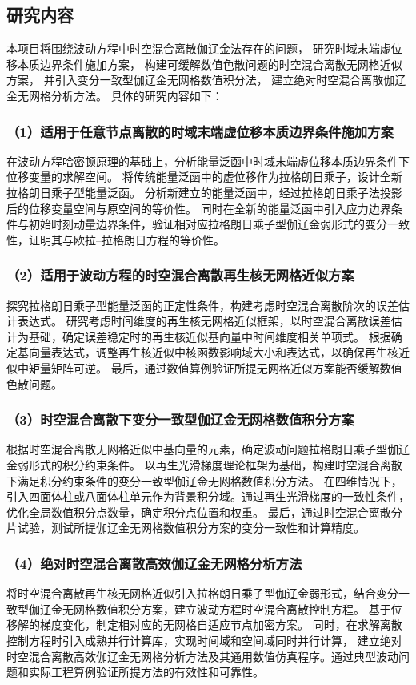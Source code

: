 \subsection{研究内容}
本项目将围绕波动方程中时空混合离散伽辽金法存在的问题，
研究时域末端虚位移本质边界条件施加方案，
构建可缓解数值色散问题的时空混合离散无网格近似方案，
并引入变分一致型伽辽金无网格数值积分法，
建立绝对时空混合离散伽辽金无网格分析方法。
具体的研究内容如下：

\subsubsection*{\bfseries （1）适用于任意节点离散的时域末端虚位移本质边界条件施加方案}
在波动方程哈密顿原理的基础上，分析能量泛函中时域末端虚位移本质边界条件下位移变量的求解空间。
将传统能量泛函中的虚位移作为拉格朗日乘子，设计全新拉格朗日乘子型能量泛函。
分析新建立的能量泛函中，经过拉格朗日乘子法投影后的位移变量空间与原空间的等价性。
同时在全新的能量泛函中引入应力边界条件与初始时刻动量边界条件，验证相对应拉格朗日乘子型伽辽金弱形式的变分一致性，证明其与欧拉--拉格朗日方程的等价性。


\subsubsection*{\bfseries （2）适用于波动方程的时空混合离散再生核无网格近似方案}
探究拉格朗日乘子型能量泛函的正定性条件，构建考虑时空混合离散阶次的误差估计表达式。
研究考虑时间维度的再生核无网格近似框架，以时空混合离散误差估计为基础，确定误差稳定时的再生核近似基向量中时间维度相关单项式。
根据确定基向量表达式，调整再生核近似中核函数影响域大小和表达式，以确保再生核近似中矩量矩阵可逆。
最后，通过数值算例验证所提无网格近似方案能否缓解数值色散问题。

\subsubsection*{\bfseries （3）时空混合离散下变分一致型伽辽金无网格数值积分方案}
根据时空混合离散无网格近似中基向量的元素，确定波动问题拉格朗日乘子型伽辽金弱形式的积分约束条件。
以再生光滑梯度理论框架为基础，构建时空混合离散下满足积分约束条件的变分一致型伽辽金无网格数值积分方法。
在四维情况下，引入四面体柱或八面体柱单元作为背景积分域。通过再生光滑梯度的一致性条件，优化全局数值积分点数量，确定积分点位置和权重。
最后，通过时空混合离散分片试验，测试所提伽辽金无网格数值积分方案的变分一致性和计算精度。

\subsubsection*{\bfseries （4）绝对时空混合离散高效伽辽金无网格分析方法}
将时空混合离散再生核无网格近似引入拉格朗日乘子型伽辽金弱形式，结合变分一致型伽辽金无网格数值积分方案，建立波动方程时空混合离散控制方程。
基于位移解的梯度变化，制定相对应的无网格自适应节点加密方案。
同时，在求解离散控制方程时引入成熟并行计算库，实现时间域和空间域同时并行计算，
建立绝对时空混合离散高效伽辽金无网格分析方法及其通用数值仿真程序。通过典型波动问题和实际工程算例验证所提方法的有效性和可靠性。

